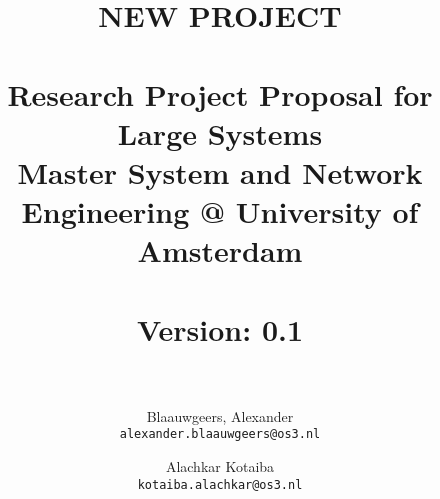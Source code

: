 \documentclass[a4paper, 12pt, one column]{article}
\title{ NEW PROJECT  \\~\\
\large Research Project Proposal for Large Systems
\\Master System and Network Engineering @ University of Amsterdam\\~\\
\textbf{Version:} 0.1\\~\\}
\author{Blaauwgeers, Alexander \\ \texttt{alexander.blaauwgeers@os3.nl} \and Alachkar Kotaiba  \\ \texttt{kotaiba.alachkar@os3.nl}}
\begin{document}
\maketitle
\clearpage
\begin{multicols}{2}
















\end{multicols}

\nocite{*}
\printbibliography
\end{document}
